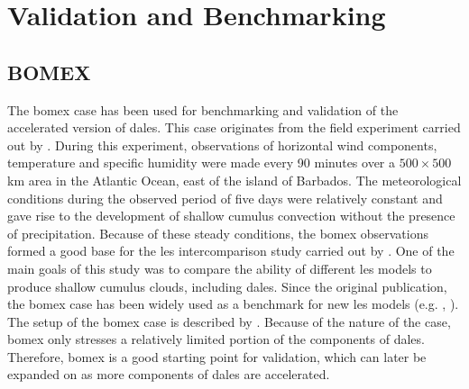 \chapter{Validation and Benchmarking}

\section{BOMEX}
The \acrfull{bomex} case has been used for benchmarking and validation of the accelerated version of \acrshort{dales}. This case originates from the field experiment carried out by \citet{hollandMeasurementsAtmosphericMass1973}. During this experiment, observations of horizontal wind components, temperature and specific humidity were made every 90 minutes over a $500 \times 500$ km area in the Atlantic Ocean, east of the island of Barbados. The meteorological conditions during the observed period of five days were relatively constant and gave rise to the development of shallow cumulus convection without the presence of precipitation. Because of these steady conditions, the \acrshort{bomex} observations formed a good base for the \acrshort{les} intercomparison study carried out by \citet{siebesmaLargeEddySimulation2003}. One of the main goals of this study was to compare the ability of different \acrshort{les} models to produce shallow cumulus clouds, including \acrshort{dales}. Since the original publication, the \acrshort{bomex} case has been widely used as a benchmark for new \acrshort{les} models (e.g. \citet{vanheerwaardenMicroHHComputationalFluid2017}, ). The setup of the \acrshort{bomex} case is described by \citet{siebesmaEvaluationParametricAssumptions1995}. Because of the nature of the case, \acrshort{bomex} only stresses a relatively limited portion of the components of \acrshort{dales}. Therefore, \acrshort{bomex} is a good starting point for validation, which can later be expanded on as more components of \acrshort{dales} are accelerated.

